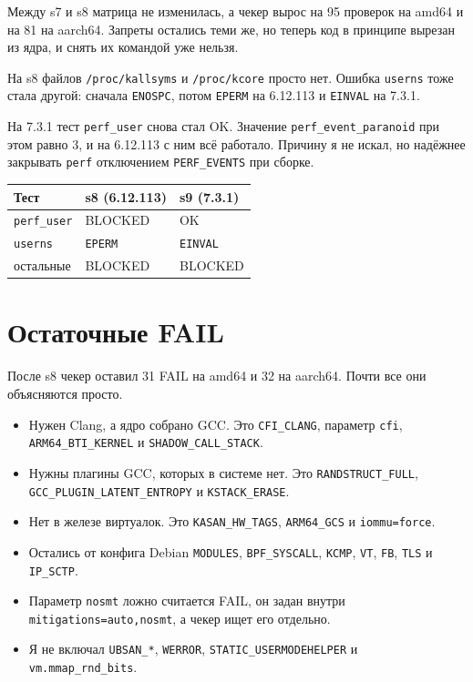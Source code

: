 \documentclass[11pt,a4paper]{article}
\newcommand{\cmd}[1]{\texttt{#1}}
\begin{document}
Между s7 и s8 матрица не изменилась, а чекер вырос на 95 проверок на amd64 и на 81 на aarch64. Запреты остались теми же, но теперь код в принципе вырезан из ядра, и снять их командой уже нельзя.

На s8 файлов \cmd{/proc/kallsyms} и \cmd{/proc/kcore} просто нет. Ошибка \cmd{userns} тоже стала другой: сначала \cmd{ENOSPC}, потом \cmd{EPERM} на 6.12.113 и \cmd{EINVAL} на 7.3.1.

На 7.3.1 тест \cmd{perf\_user} снова стал OK. Значение \cmd{perf\_event\_paranoid} при этом равно 3, и на 6.12.113 с ним всё работало. Причину я не искал, но надёжнее закрывать \cmd{perf} отключением \cmd{PERF\_EVENTS} при сборке.

\begin{tabular}{@{}lll@{}}
\toprule
Тест & s8 (6.12.113) & s9 (7.3.1)\\
\midrule
\cmd{perf\_user} & BLOCKED & OK\\
\cmd{userns} & \cmd{EPERM} & \cmd{EINVAL}\\
остальные & BLOCKED & BLOCKED\\
\bottomrule
\end{tabular}

\section{Остаточные FAIL}
После s8 чекер оставил 31 FAIL на amd64 и 32 на aarch64. Почти все они объясняются просто.

\begin{itemize}
\item Нужен Clang, а ядро собрано GCC. Это \cmd{CFI\_CLANG}, параметр \cmd{cfi}, \cmd{ARM64\_BTI\_KERNEL} и \cmd{SHADOW\_CALL\_STACK}.
\item Нужны плагины GCC, которых в системе нет. Это \cmd{RANDSTRUCT\_FULL}, \cmd{GCC\_PLUGIN\_LATENT\_ENTROPY} и \cmd{KSTACK\_ERASE}.
\item Нет в железе виртуалок. Это \cmd{KASAN\_HW\_TAGS}, \cmd{ARM64\_GCS} и \cmd{iommu=force}.
\item Остались от конфига Debian \cmd{MODULES}, \cmd{BPF\_SYSCALL}, \cmd{KCMP}, \cmd{VT}, \cmd{FB}, \cmd{TLS} и \cmd{IP\_SCTP}.
\item Параметр \cmd{nosmt} ложно считается FAIL, он задан внутри \cmd{mitigations=auto,nosmt}, а чекер ищет его отдельно.
\item Я не включал \cmd{UBSAN\_*}, \cmd{WERROR}, \cmd{STATIC\_USERMODEHELPER} и \cmd{vm.mmap\_rnd\_bits}.
\end{itemize}
\end{document}
